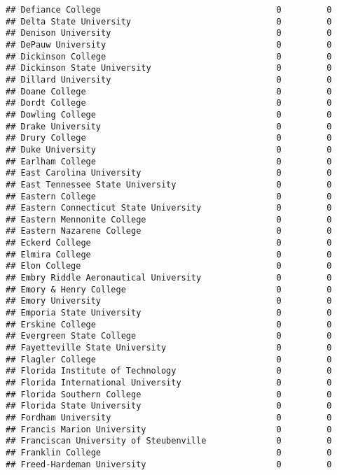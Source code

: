 \documentclass[
]{article}
\begin{document}
\begin{verbatim}
## Defiance College                                   0         0
## Delta State University                             0         0
## Denison University                                 0         0
## DePauw University                                  0         0
## Dickinson College                                  0         0
## Dickinson State University                         0         0
## Dillard University                                 0         0
## Doane College                                      0         0
## Dordt College                                      0         0
## Dowling College                                    0         0
## Drake University                                   0         0
## Drury College                                      0         0
## Duke University                                    0         0
## Earlham College                                    0         0
## East Carolina University                           0         0
## East Tennessee State University                    0         0
## Eastern College                                    0         0
## Eastern Connecticut State University               0         0
## Eastern Mennonite College                          0         0
## Eastern Nazarene College                           0         0
## Eckerd College                                     0         0
## Elmira College                                     0         0
## Elon College                                       0         0
## Embry Riddle Aeronautical University               0         0
## Emory & Henry College                              0         0
## Emory University                                   0         0
## Emporia State University                           0         0
## Erskine College                                    0         0
## Evergreen State College                            0         0
## Fayetteville State University                      0         0
## Flagler College                                    0         0
## Florida Institute of Technology                    0         0
## Florida International University                   0         0
## Florida Southern College                           0         0
## Florida State University                           0         0
## Fordham University                                 0         0
## Francis Marion University                          0         0
## Franciscan University of Steubenville              0         0
## Franklin College                                   0         0
## Freed-Hardeman University                          0         0

\end{verbatim}
\end{document}
